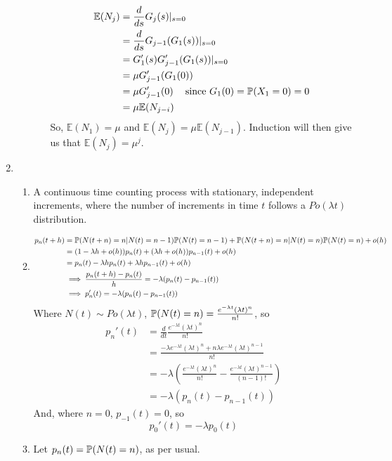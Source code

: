 \documentclass{article}
\begin{document}
\begin{enumerate}
\begin{enumerate}
\begin{enumerate}
\begin{align*}
\mathbb{E}(N_j) &= \frac{d}{ds}G_j(s)|_{s=0}\\
&= \frac{d}{ds}G_{j-1}(G_1(s))|_{s=0}\\
&= G_1'(s)G_{j-1}'(G_1(s))|_{s=0}\\
&= \mu G_{j-1}'(G_1(0)) \\
&= \mu G_{j-1}'(0) \mbox{\; \; since $G_1(0)=\mathbb{P}(X_1=0) = 0$} \\
&= \mu \mathbb{E}(N_{j-i})
\end{align*}
So, $\mathbb{E}(N_1) = \mu$ and $\mathbb{E}(N_j) = \mu \mathbb{E}(N_{j-1})$. Induction will then give us that $\mathbb{E}(N_j) = \mu^j$.
\end{enumerate}

\end{enumerate}
\clearpage
\item
\begin{enumerate}
\item
A continuous time counting process with stationary, independent increments, where the number of increments in time $t$ follows a $Po(\lambda t)$ distribution.
\item
\begin{align*}
p_n(t+h) &= \mathbb{P}(N(t+n)=n | N(t) = n-1)\mathbb{P}(N(t)=n-1) + \mathbb{P}(N(t+n)=n | N(t) = n)\mathbb{P}(N(t)=n) + o(h) \\
&= (1-\lambda h +o(h))p_n(t) + (\lambda h + o(h))p_{n-1}(t) + o(h)\\
&= p_n(t) -\lambda h p_n(t) + \lambda h p_{n-1}(t) + o(h)\\
&\implies \frac{p_n(t+h)-p_n(t)}{h} = -\lambda(p_n(t)-p_{n-1}(t))\\
&\implies p_n'(t) = -\lambda(p_n(t)-p_{n-1}(t))
\end{align*}
Where $N(t) \sim  Po(\lambda t)$, $\mathbb{P}(N(t)=n) = \frac{e^{-\lambda t}(\lambda t)^n}{n!}$, so
\begin{align*}
p_n'(t) &= \frac{d}{dt} \frac{e^{-\lambda t}(\lambda t)^n}{n!}\\
&= \frac{-\lambda e^{-\lambda t}(\lambda t)^n + n \lambda e^{-\lambda t}(\lambda t)^{n-1}}{n!}\\
&= -\lambda \left( \frac{e^{-\lambda t}(\lambda t)^n}{n!} - \frac{e^{-\lambda t}(\lambda t)^{n-1}}{(n-1)!}\right)\\
&= -\lambda(p_n(t) - p_{n-1}(t))
\end{align*}
And, where $n=0$, $p_{-1}(t) = 0$, so 
$$
p_0'(t) = -\lambda p_0(t)
$$
\item
Let $p_n(t) = \mathbb{P}(N(t) = n)$, as per usual.
\begin{align*}

\end{align*}
\end{enumerate}
\end{enumerate}
\end{document}
